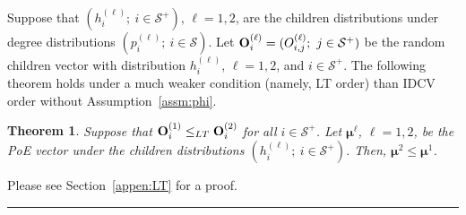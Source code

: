 \documentclass[10pt, journal, compsoc]{IEEEtran}
\newcommand {\cS}{{\mathcal{S}}}
\newcommand {\bO} {{\bf O}}
\newcommand {\bmu} {\boldsymbol{\mu}}
\newtheorem{theorem}{Theorem}
\newcommand{\myskip}{\\ \vspace{-0.1in}}
\def\QED{~\rule[-1pt]{5pt}{5pt}\par\medskip}
\newenvironment{proof}{{\bf Proof: \ }}{ \hfill \QED}
\begin{document}
Suppose that $(h^{(\ell)}_i; \ i \in \cS^+)$, 
$\ell = 1, 2$, 
are the children distributions under degree
distributions $(p^{(\ell)}_i; 
\ i \in \cS)$. Let $\bO^{(\ell)}_i
= (O^{(\ell)}_{i,j}; \ j \in \cS^+)$
be the random children vector with distribution
$h^{(\ell)}_i$, $\ell = 1, 2$, and $i \in \cS^+$. 
The following theorem holds under a much weaker 
condition (namely, LT order) than IDCV order
without Assumption~\ref{assm:phi}.



\begin{theorem}	\label{thm:LT}
Suppose that ${\bf O}^{(1)}_i \leq_{LT}
{\bf O}^{(2)}_i$ for all $i \in \cS^+$. 
Let $\bmu^\ell$, $\ell = 1, 2$,
be the PoE vector under the children 
distributions 
$(h^{(\ell)}_i; \ i \in \cS^+)$. Then, 
$\bmu^2 \leq \bmu^1$. 
\myskip
\end{theorem}
\begin{proof}
Please see Section~\ref{appen:LT} for a proof. 
\end{proof}
\end{document}
